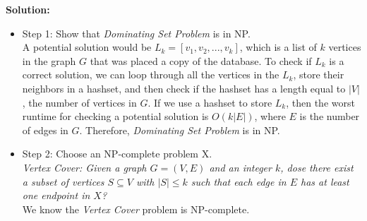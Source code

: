 \documentclass{article}
\begin{document}
\begin{tcolorbox}
{\bf Solution:} 
\begin{itemize}
\item Step 1: Show that  {\em Dominating Set Problem} is in NP.\\
A potential solution would be $L_k = [v_1, v_2, ..., v_k]$, which is a list of $k$ vertices in the graph $G$ that was placed a copy of the database. To check if $L_k$ is a correct solution, we can loop through all the vertices in the $L_k$, store their neighbors in a hashset, and then check if the hashset has a length equal to $|V|$, the number of vertices in $G$. If we use a hashset to store $L_k$, then the worst runtime for checking a potential solution is $O(k|E|)$, where $E$ is the number of edges in $G$. Therefore, {\em Dominating Set Problem} is in NP. 

\item Step 2: Choose an NP-complete problem X.\\
{\em Vertex Cover: Given a graph $G = (V, E)$ and an integer $k$, dose there exist a subset of vertices $S \subseteq V$ with $|S| \leq k$ such that each edge in $E$ has at least one endpoint in $X$? }\\ 
We know the {\em Vertex Cover} problem is NP-complete. 
\end{itemize}
\end{tcolorbox}
\end{document}
